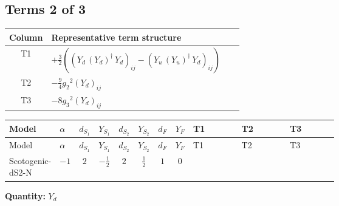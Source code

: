 \documentclass[8pt]{article}
\begin{document}
\begin{landscape}
\subsection*{Terms 2 of 3}
\begin{center}
\begin{tabular}{@{}c >{\raggedright\arraybackslash}p{0.82\linewidth}@{}}
\toprule
Column & Representative term structure \\
\midrule
T1 & \(\displaystyle +\frac{3}{2} (\left({Y_d}\,\left({Y_d}\right)^{\dagger}\,{Y_d}\right)_{ij}-\left({Y_u}\,\left({Y_u}\right)^{\dagger}\,{Y_d}\right)_{ij})\) \\
\midrule
T2 & \(\displaystyle -\frac{9}{4} {g_2}^2 \left({Y_d}\right)_{ij}\) \\
\midrule
T3 & \(\displaystyle -8 {g_3}^2 \left({Y_d}\right)_{ij}\) \\
\midrule
\bottomrule
\end{tabular}
\end{center}
\smallskip
\tiny
\begin{longtable}{@{}llcccccc >{\raggedright\arraybackslash}p{0.21\linewidth} >{\raggedright\arraybackslash}p{0.21\linewidth} >{\raggedright\arraybackslash}p{0.21\linewidth}@{}}
\toprule
Model & $\alpha$ & $d_{S_1}$ & $Y_{S_1}$ & $d_{S_2}$ & $Y_{S_2}$ & $d_F$ & $Y_F$ & T1 & T2 & T3 \\
\midrule
\endfirsthead
\toprule
Model & $\alpha$ & $d_{S_1}$ & $Y_{S_1}$ & $d_{S_2}$ & $Y_{S_2}$ & $d_F$ & $Y_F$ & T1 & T2 & T3 \\
\midrule
\endhead
Scotogenic-dS2-N & $-1$ & $2$ & $-\frac{1}{2}$ & $2$ & $\frac{1}{2}$ & $1$ & $0$ & \scriptsize\adjustbox{max width=\linewidth}{$\begin{gathered} +\frac{3}{2} (\left({Y_d}\,\left({Y_d}\right)^{\dagger}\,{Y_d}\right)_{ij}-\left({Y_u}\,\left({Y_u}\right)^{\dagger}\,{Y_d}\right)_{ij})\end{gathered}$} & \scriptsize\adjustbox{max width=\linewidth}{$\begin{gathered} -\frac{9}{4} {g_2}^2 \left({Y_d}\right)_{ij}\end{gathered}$} & \scriptsize\adjustbox{max width=\linewidth}{$\begin{gathered} -8 {g_3}^2 \left({Y_d}\right)_{ij}\end{gathered}$} \\
\midrule
\bottomrule
\end{longtable}
\clearpage
\noindent\textbf{Quantity: }$Y_d$\par\smallskip

\end{landscape}
\end{document}
